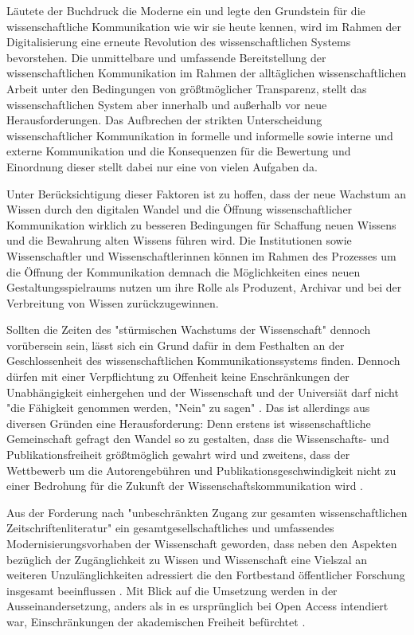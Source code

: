 Läutete der Buchdruck die Moderne ein und legte den Grundstein für die wissenschaftliche Kommunikation wie wir sie heute kennen, wird im Rahmen der Digitalisierung eine erneute Revolution des wissenschaftlichen Systems bevorstehen. Die unmittelbare und umfassende Bereitstellung der wissenschaftlichen Kommunikation im Rahmen der alltäglichen wissenschaftlichen Arbeit unter den Bedingungen von größtmöglicher Transparenz, stellt das wissenschaftlichen System aber innerhalb und außerhalb vor neue Herausforderungen. Das Aufbrechen der strikten Unterscheidung wissenschaftlicher Kommunikation in formelle und informelle sowie interne und externe Kommunikation und die Konsequenzen für die Bewertung und Einordnung dieser stellt dabei nur eine von vielen Aufgaben da.

Unter Berücksichtigung dieser Faktoren ist zu hoffen, dass der neue Wachstum an Wissen durch den digitalen Wandel und die Öffnung wissenschaftlicher Kommunikation wirklich zu besseren Bedingungen für Schaffung neuen Wissens und die Bewahrung alten Wissens führen wird. Die Institutionen sowie Wissenschaftler und Wissenschaftlerinnen können im Rahmen des Prozesses um die Öffnung der Kommunikation demnach die Möglichkeiten eines neuen Gestaltungsspielraums nutzen um ihre Rolle als Produzent, Archivar und bei der Verbreitung von Wissen zurückzugewinnen.

Sollten die Zeiten des "stürmischen Wachstums der Wissenschaft" \cite{K_lbel_2002} dennoch vorübersein sein, lässt sich ein Grund dafür in dem Festhalten an der Geschlossenheit des wissenschaftlichen Kommunikationssystems finden. Dennoch dürfen mit einer Verpflichtung zu Offenheit keine Enschränkungen der Unabhängigkeit einhergehen und der Wissenschaft und der Universiät darf nicht "die Fähigkeit genommen werden, "Nein" zu sagen" \cite{suchen_Hornbostel_2006}. Das ist allerdings aus diversen Gründen eine Herausforderung: Denn erstens ist wissenschaftliche Gemeinschaft gefragt den Wandel so zu gestalten, dass die Wissenschafts- und Publikationsfreiheit größtmöglich gewahrt wird und zweitens, dass der Wettbewerb um die Autorengebühren und Publikationsgeschwindigkeit nicht zu einer Bedrohung für die Zukunft der Wissenschaftskommunikation wird \cite{Beall_2012} \cite{Lossau_oa_2007}.

Aus der Forderung nach "unbeschränkten Zugang zur gesamten wissenschaftlichen Zeitschriftenliteratur" \cite{boai_2012} ein gesamtgesellschaftliches und umfassendes Modernisierungsvorhaben der Wissenschaft geworden, dass neben den Aspekten bezüglich der Zugänglichkeit zu Wissen und Wissenschaft eine Vielszal an weiteren Unzulänglichkeiten adressiert die den Fortbestand öffentlicher Forschung insgesamt beeinflussen \cite{brembs2015open}. Mit Blick auf die Umsetzung werden in der Ausseinandersetzung, anders als in es ursprünglich bei Open Access intendiert war, Einschränkungen der akademischen Freiheit befürchtet \cite{hagner_2015_sache_buches}.

